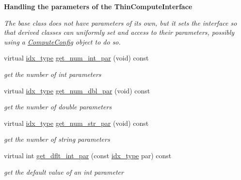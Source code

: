 \begin{Indent}\textbf{ Handling the parameters of the Thin\+Compute\+Interface}\par
{\em The base class does not have parameters of its own, but it sets the interface so that derived classes can uniformly set and access to their parameters, possibly using a \mbox{\hyperlink{class_s_m_spp__di__unipi__it_1_1_compute_config}{Compute\+Config}} object to do so. }\begin{DoxyCompactItemize}
\item 
virtual \mbox{\hyperlink{class_s_m_spp__di__unipi__it_1_1_thin_compute_interface_aa3d710629ad8c434286726ad810c3b47}{idx\+\_\+type}} \mbox{\hyperlink{class_s_m_spp__di__unipi__it_1_1_thin_compute_interface_a1e009f6b43f7966bf4b4740e0b4cff58}{get\+\_\+num\+\_\+int\+\_\+par}} (void) const
\begin{DoxyCompactList}\small\item\em get the number of int parameters \end{DoxyCompactList}\item 
virtual \mbox{\hyperlink{class_s_m_spp__di__unipi__it_1_1_thin_compute_interface_aa3d710629ad8c434286726ad810c3b47}{idx\+\_\+type}} \mbox{\hyperlink{class_s_m_spp__di__unipi__it_1_1_thin_compute_interface_a03d2492bc7caa7e7821fa1bc4f06a36e}{get\+\_\+num\+\_\+dbl\+\_\+par}} (void) const
\begin{DoxyCompactList}\small\item\em get the number of double parameters \end{DoxyCompactList}\item 
virtual \mbox{\hyperlink{class_s_m_spp__di__unipi__it_1_1_thin_compute_interface_aa3d710629ad8c434286726ad810c3b47}{idx\+\_\+type}} \mbox{\hyperlink{class_s_m_spp__di__unipi__it_1_1_thin_compute_interface_a23ef8ba7477625aec4a54dddff053468}{get\+\_\+num\+\_\+str\+\_\+par}} (void) const
\begin{DoxyCompactList}\small\item\em get the number of string parameters \end{DoxyCompactList}\item 
virtual int \mbox{\hyperlink{class_s_m_spp__di__unipi__it_1_1_thin_compute_interface_aee367363e42f86be5376165878f958f5}{get\+\_\+dflt\+\_\+int\+\_\+par}} (const \mbox{\hyperlink{class_s_m_spp__di__unipi__it_1_1_thin_compute_interface_aa3d710629ad8c434286726ad810c3b47}{idx\+\_\+type}} par) const
\begin{DoxyCompactList}\small\item\em get the default value of an int parameter \end{DoxyCompactList}\item 

\end{DoxyCompactItemize}
\end{Indent}
